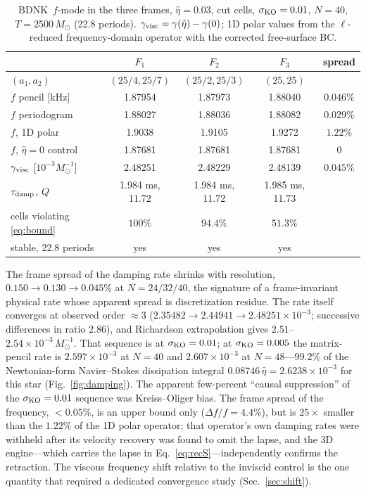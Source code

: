 \documentclass[aps,prd,reprint,amsmath,amssymb,nofootinbib,longbibliography,superscriptaddress]{revtex4-2}
\newcommand{\Msun}{M_\odot}
\newcommand{\BDNK}{BDNK}
\newcommand{\KO}{\sigma_{\rm KO}}
\begin{document}
\begin{table}[tb]
\caption{\BDNK\ $f$-mode in the three frames, $\hat\eta=0.03$, cut cells, $\KO=0.01$, $N=40$,
$T=2500\,\Msun$ (22.8 periods). $\gamma_{\rm visc}=\gamma(\hat\eta)-\gamma(0)$; 1D polar values
from the $\ell$-reduced frequency-domain operator with the corrected free-surface BC.}
\label{tab:frames}
\begin{ruledtabular}
\begin{tabular}{lcccc}
 & $F_1$ & $F_2$ & $F_3$ & spread\\
\hline
$(a_1,a_2)$ & $(25/4,25/7)$ & $(25/2,25/3)$ & $(25,25)$ & \\
$f$ pencil [kHz] & 1.87954 & 1.87973 & 1.88040 & $0.046\%$\\
$f$ periodogram & 1.88027 & 1.88036 & 1.88082 & $0.029\%$\\
$f$, 1D polar & 1.9038 & 1.9105 & 1.9272 & $1.22\%$\\
$f$, $\hat\eta=0$ control & 1.87681 & 1.87681 & 1.87681 & $0$\\
$\gamma_{\rm visc}$ [$10^{-3}\Msun^{-1}$] & 2.48251 & 2.48229 & 2.48139 & $\bm{0.045\%}$\\
$\tau_{\rm damp}$, $Q$ & 1.984 ms, 11.72 & 1.984 ms, 11.72 & 1.985 ms, 11.73 & \\
cells violating \eqref{eq:bound} & $100\%$ & $94.4\%$ & $51.3\%$ & \\
stable, 22.8 periods & yes & yes & yes & \\
\end{tabular}
\end{ruledtabular}
\end{table}

The frame spread of the damping rate shrinks with resolution, $0.150\to0.130\to0.045\%$ at
$N=24/32/40$, the signature of a frame-invariant physical rate whose apparent spread is
discretization residue. The rate itself converges at observed order $\approx3$
($2.35482\to2.44941\to2.48251\times10^{-3}$; successive differences in ratio $2.86$), and
Richardson extrapolation gives $2.51$--$2.54\times10^{-3}\,\Msun^{-1}$. That sequence is at
$\KO = 0.01$; at $\KO = 0.005$ the matrix-pencil rate is $2.597\times10^{-3}$ at $N=40$ and
$2.607\times10^{-3}$ at $N=48$---$99.2\%$ of the Newtonian-form Navier--Stokes dissipation
integral $0.08746\,\hat\eta = 2.6238\times10^{-3}$ for this star (Fig.~\ref{fig:damping}). The
apparent few-percent ``causal suppression'' of the $\KO=0.01$ sequence was Kreiss--Oliger bias. The frame spread of
the frequency, $<0.05\%$, is an upper bound only ($\Delta f/f = 4.4\%$), but is $25\times$ smaller
than the $1.22\%$ of the 1D polar operator; that operator's own damping rates were withheld
after its velocity recovery was found to omit the lapse, and the 3D engine---which carries the
lapse in Eq.~\eqref{eq:recS}---independently confirms the retraction. The viscous frequency
shift relative to the inviscid control is the one quantity that required a dedicated
convergence study (Sec.~\ref{sec:shift}).
\end{document}
